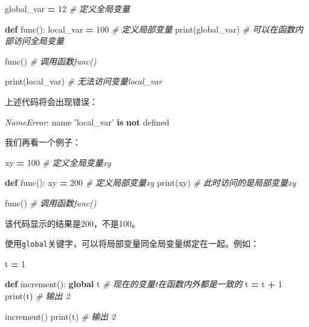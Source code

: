 \documentclass[]{ctexbook}
\newenvironment{Shaded}{\begin{snugshade}}{\end{snugshade}}
\newcommand{\BuiltInTok}[1]{#1}
\newcommand{\CommentTok}[1]{\textcolor[rgb]{0.56,0.35,0.01}{\textit{#1}}}
\newcommand{\DecValTok}[1]{\textcolor[rgb]{0.00,0.00,0.81}{#1}}
\newcommand{\KeywordTok}[1]{\textcolor[rgb]{0.13,0.29,0.53}{\textbf{#1}}}
\newcommand{\NormalTok}[1]{#1}
\newcommand{\OperatorTok}[1]{\textcolor[rgb]{0.81,0.36,0.00}{\textbf{#1}}}
\newcommand{\PreprocessorTok}[1]{\textcolor[rgb]{0.56,0.35,0.01}{\textit{#1}}}
\newcommand{\StringTok}[1]{\textcolor[rgb]{0.31,0.60,0.02}{#1}}
\begin{document}
\begin{Shaded}
\begin{Highlighting}[]
\NormalTok{global_var }\OperatorTok{=} \DecValTok{12}         \CommentTok{# 定义全局变量}

\KeywordTok{def}\NormalTok{ func():}
\NormalTok{    local_var }\OperatorTok{=} \DecValTok{100}     \CommentTok{# 定义局部变量}
    \BuiltInTok{print}\NormalTok{(global_var)   }\CommentTok{# 可以在函数内部访问全局变量}

\NormalTok{func()                  }\CommentTok{# 调用函数func()}

\BuiltInTok{print}\NormalTok{(local_var)        }\CommentTok{# 无法访问变量local_var}
\end{Highlighting}
\end{Shaded}

上述代码将会出现错误：

\begin{Shaded}
\begin{Highlighting}[]
\PreprocessorTok{NameError}\NormalTok{: name }\StringTok{'local_var'} \KeywordTok{is} \KeywordTok{not}\NormalTok{ defined}
\end{Highlighting}
\end{Shaded}

我们再看一个例子：

\begin{Shaded}
\begin{Highlighting}[]
\NormalTok{xy }\OperatorTok{=} \DecValTok{100}         \CommentTok{# 定义全局变量xy}

\KeywordTok{def}\NormalTok{ func():}
\NormalTok{    xy }\OperatorTok{=} \DecValTok{200}    \CommentTok{# 定义局部变量xy}
    \BuiltInTok{print}\NormalTok{(xy)   }\CommentTok{# 此时访问的是局部变量xy}

\NormalTok{func()          }\CommentTok{# 调用函数func()}
\end{Highlighting}
\end{Shaded}

该代码显示的结果是200，不是100。

使用\texttt{global}关键字，可以将局部变量同全局变量绑定在一起。例如：

\begin{Shaded}
\begin{Highlighting}[]
\NormalTok{t }\OperatorTok{=} \DecValTok{1}

\KeywordTok{def}\NormalTok{ increment():}
    \KeywordTok{global}\NormalTok{ t    }\CommentTok{# 现在的变量t在函数内外都是一致的}
\NormalTok{    t }\OperatorTok{=}\NormalTok{ t }\OperatorTok{+} \DecValTok{1}
    \BuiltInTok{print}\NormalTok{(t)    }\CommentTok{# 输出 2}

\NormalTok{increment()}
\BuiltInTok{print}\NormalTok{(t)        }\CommentTok{# 输出 2}
\end{Highlighting}
\end{Shaded}
\end{document}
